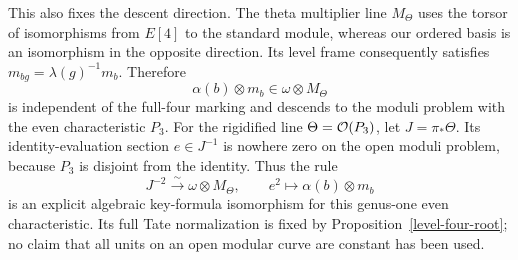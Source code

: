 \documentclass[11pt]{article}
\theoremstyle{remark}\newtheorem{remark}[theorem]{Remark}
\begin{document}
This also fixes the descent direction. The theta multiplier line
$M_\Theta$ uses the torsor of isomorphisms from $E[4]$ to the standard
module, whereas our ordered basis is an isomorphism in the opposite
direction. Its level frame consequently satisfies
$m_{bg}=\lambda(g)^{-1}m_b$. Therefore
\[
 \alpha(b)\otimes m_b\in\omega\otimes M_\Theta
\]
is independent of the full-four marking and descends to the moduli
problem with the even characteristic $P_3$.
For the rigidified line $\Theta=\mathcal O(P_3)$, let $J=\pi_*\Theta$.
Its identity-evaluation section $e\in J^{-1}$ is nowhere zero on
the open moduli problem, because $P_3$ is disjoint from the identity.
Thus the rule
\[
 J^{-2}\xrightarrow{\ \sim\ }\omega\otimes M_\Theta,
 \qquad e^2\longmapsto\alpha(b)\otimes m_b
\]
is an explicit algebraic key-formula isomorphism for this genus-one
even characteristic. Its full Tate normalization is fixed by
Proposition~\ref{level-four-root}; no claim that all units on an open
modular curve are constant has been used.
\end{document}
